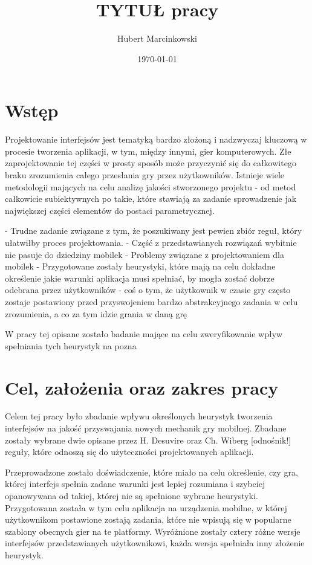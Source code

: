\documentclass[a4paper,12pt,numbers=noenddot]{report}
\title{TYTUŁ pracy}
\date{\today}
\author{Hubert Marcinkowski}
\begin{document}
	\nocite{*}
	\maketitle

	\newpage
	\tableofcontents
	\newpage
	
\chapter{Wstęp}
Projektowanie interfejsów jest tematyką bardzo złożoną i nadzwyczaj kluczową w procesie tworzenia aplikacji, w tym, między innymi, gier komputerowych. Złe zaprojektowanie tej części w prosty sposób może przyczynić się do całkowitego braku zrozumienia całego przesłania gry przez użytkowników. Istnieje wiele metodologii mających na celu analizę jakości stworzonego projektu - od metod całkowicie subiektywnych po takie, które stawiają za zadanie sprowadzenie jak największej części elementów do postaci parametrycznej. 

- Trudne zadanie związane z tym, że poszukiwany jest pewien zbiór reguł, który ułatwiłby proces projektowania. 
- Część z przedstawianych rozwiązań wybitnie nie pasuje do dziedziny mobilek
- Problemy związane z projektowaniem dla mobilek
- Przygotowane zostały heurystyki, które mają na celu dokładne określenie jakie warunki aplikacja musi spełniać, by mogła zostać dobrze odebrana przez użytkowników
- coś o tym, że użytkownik w czasie gry często zostaje postawiony przed przyswojeniem bardzo abstrakcyjnego zadania w celu zrozumienia, a co za tym idzie grania w daną grę

W pracy tej opisane zostało badanie mające na celu zweryfikowanie wpływ spełniania tych heurystyk na pozna

\chapter{Cel, założenia oraz zakres pracy}
Celem tej pracy było zbadanie wpływu określonych heurystyk tworzenia interfejsów na jakość przyswajania nowych mechanik gry mobilnej. Zbadane zostały wybrane dwie opisane przez H. Desuvire oraz Ch. Wiberg [odnośnik!] reguły, które odnoszą się do użyteczności projektowanych aplikacji.

Przeprowadzone zostało doświadczenie, które miało na celu określenie, czy gra, której interfejs spełnia zadane warunki jest lepiej rozumiana i szybciej opanowywana od takiej, której nie są spełnione wybrane heurystyki. Przygotowana została w tym celu aplikacja na urządzenia mobilne, w której użytkownikom postawione zostają zadania, które nie wpisują się w popularne szablony obecnych gier na te platformy. Wyróżnione zostały cztery różne wersje interfejsów przedstawianych użytkownikowi, każda wersja spełniała inny złożenie heurystyk.
\end{document}
